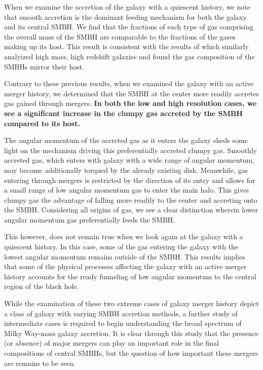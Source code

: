 \documentclass[12pt,headA,chapB]{fiskthesis}
\begin{document}
When we examine the accretion of the galaxy with a quiescent history, we note that smooth accretion is the dominant feeding mechanism for both the galaxy and its central SMBH. We find that the fractions of each type of gas comprising the overall mass of the SMBH are comparable to the fractions of the gases making up its host. This result is consistent with the results of \cite{Bellovary2013} which similarly analyized high mass, high redshift galaxies and found the gas composition of the SMBHs mirror their host.

Contrary to these previous results, when we examined the galaxy with an active merger history, we determined that the SMBH at the center more readily accretes gas gained through mergers. \textbf{In both the low and high resolution cases, we see a significant increase in the clumpy gas accreted by the SMBH compared to its host.} 

The angular momentum of the accreted gas as it enters the galaxy sheds some light on the mechanism driving this preferentially accreted clumpy gas. Smoothly accreted gas, which enters with galaxy with a wide range of angular momentum, may become additionally torqued by the already existing disk. Meanwhile, gas entering through mergers is restricted by the direction of its entry and allows for a small range of low angular momentum gas to enter the main halo. This gives clumpy gas the advantage of falling more readily to the center and accreting onto the SMBH. Considering all origins of gas, we see a clear distinction wherein lower angular momentum gas preferentially feeds the SMBH.

This however, does not remain true when we look again at the galaxy with a quiescent history. In this case, some of the gas entering the galaxy with the lowest angular momentum remains outside of the SMBH. This results implies that some of the physical processes affecting the galaxy with an active merger history accounts for the ready funneling of low angular momentum to the central region of the black hole. 

While the examination of these two extreme cases of galaxy merger history depict a class of galaxy with varying SMBH accretion methods, a further study of intermediate cases is required to begin understanding the broad spectrum of Milky Way-mass galaxy accretion. It is clear through this study that the presence (or absence) of major mergers can play an important role in the final compositions of central SMBHs, but the question of how important these mergers are remains to be seen.
\end{document}
